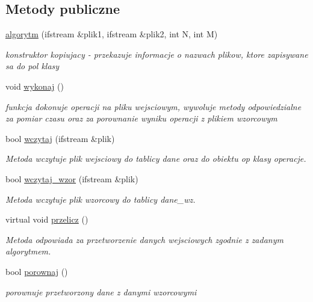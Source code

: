 \subsection*{\-Metody publiczne}
\begin{DoxyCompactItemize}
\item 
\hyperlink{classalgorytm_af51409bfda664789d3a970bb0aa91f41}{algorytm} (ifstream \&plik1, ifstream \&plik2, int \-N, int \-M)
\begin{DoxyCompactList}\small\item\em konstruktor kopiujacy -\/ przekazuje informacje o nazwach plikow, ktore zapisywane sa do pol klasy \end{DoxyCompactList}\item 
void \hyperlink{classalgorytm_a85ba543fad39e8987bbda4ee698b5fec}{wykonaj} ()
\begin{DoxyCompactList}\small\item\em funkcja dokonuje operacji na pliku wejsciowym, wywoluje metody odpowiedzialne za pomiar czasu oraz za porownanie wyniku operacji z plikiem wzorcowym \end{DoxyCompactList}\item 
bool \hyperlink{classalgorytm_aa12f93ae34e49251044a72fd76ce3ebb}{wczytaj} (ifstream \&plik)
\begin{DoxyCompactList}\small\item\em \-Metoda wczytuje plik wejsciowy do tablicy {\ttfamily dane} oraz do obiektu {\ttfamily op} klasy {\ttfamily operacje}. \end{DoxyCompactList}\item 
bool \hyperlink{classalgorytm_abf132ac5055b185a380f1285a29f75fd}{wczytaj\-\_\-wzor} (ifstream \&plik)
\begin{DoxyCompactList}\small\item\em \-Metoda wczytuje plik wzorcowy do tablicy {\ttfamily dane\-\_\-wz}. \end{DoxyCompactList}\item 
virtual void \hyperlink{classalgorytm_aeefdd677ca8b9475a15547dcf8dd461f}{przelicz} ()
\begin{DoxyCompactList}\small\item\em \-Metoda odpowiada za przetworzenie danych wejsciowych zgodnie z zadanym algorytmem. \end{DoxyCompactList}\item 
bool \hyperlink{classalgorytm_a167adca6239e12cb5d362fd7c905dde0}{porownaj} ()
\begin{DoxyCompactList}\small\item\em porownuje przetworzony dane z danymi wzorcowymi \end{DoxyCompactList}\item 

\end{DoxyCompactItemize}
